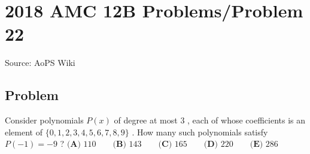 \documentclass[12pt]{article}
\begin{document}
\section*{{2018 AMC 12B Problems/Problem 22}}
Source: AoPS Wiki

\subsection*{Problem}
Consider polynomials $P(x)$ of degree at most $3$ , each of whose coefficients is an element of $\{0, 1, 2, 3, 4, 5, 6, 7, 8, 9\}$ . How many such polynomials satisfy $P(-1) = -9$ ? $\textbf{(A) } 110 \qquad \textbf{(B) } 143 \qquad \textbf{(C) } 165 \qquad \textbf{(D) } 220 \qquad \textbf{(E) } 286$
\end{document}
